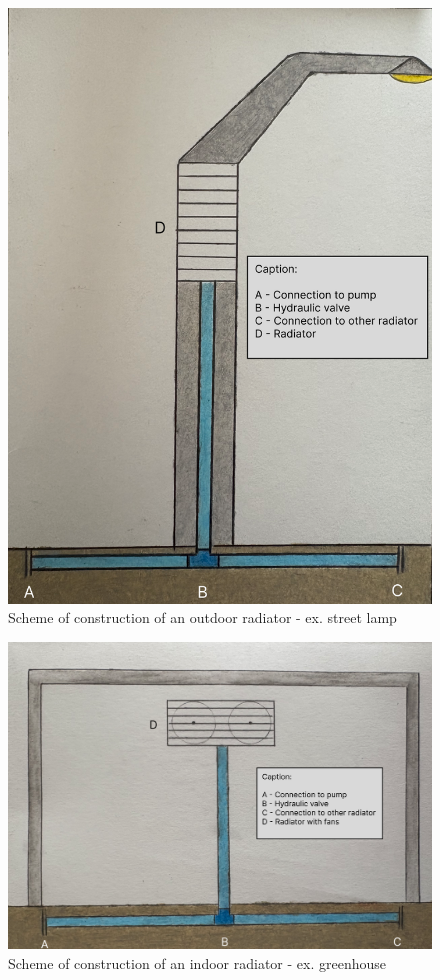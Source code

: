 \begin{figure}[ht]
    \centering
    \includegraphics[scale=0.3]{pictures/poste.png}
    \caption{Scheme of construction of an outdoor radiator - ex. street lamp}
    \label{poste}
\end{figure}

\begin{figure}[ht]
    \centering
    \includegraphics[scale=0.25]{pictures/estufa.png}
    \caption{Scheme of construction of an indoor radiator - ex. greenhouse}
    \label{estufa}
\end{figure}

